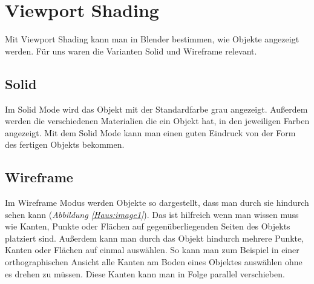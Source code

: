 \section{Viewport Shading}
Mit Viewport Shading kann man in Blender bestimmen, wie Objekte angezeigt werden. Für uns waren die Varianten Solid und Wireframe relevant.

\subsection{Solid}
Im Solid Mode wird das Objekt mit der Standardfarbe grau angezeigt.\citep{viewportshading:link} Außerdem werden die verschiedenen Materialien die ein Objekt
hat, in den jeweiligen Farben angezeigt. Mit dem Solid Mode kann man einen guten Eindruck von der Form des fertigen Objekts bekommen.

\subsection{Wireframe}
Im Wireframe Modus werden Objekte so dargestellt, dass man durch sie hindurch sehen kann (\textit{Abbildung \ref{Haus:image1}}).\citep{viewportshading:link}
Das ist hilfreich wenn man wissen muss wie Kanten, Punkte oder Flächen auf gegenüberliegenden Seiten des Objekts
platziert sind. Außerdem kann man durch das Objekt hindurch mehrere Punkte, Kanten oder Flächen auf einmal auswählen. So kann man zum Beispiel
in einer orthographischen Ansicht alle Kanten am Boden eines Objektes auswählen ohne es drehen zu müssen. Diese Kanten kann
man in Folge parallel verschieben.
